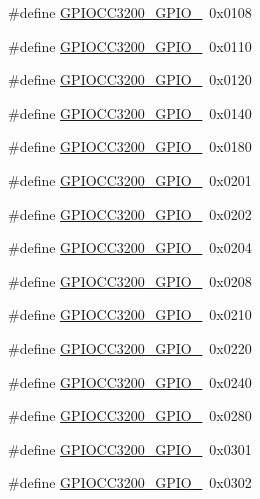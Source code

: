 \begin{DoxyCompactItemize}
\item 
\#define \hyperlink{_g_p_i_o_c_c3200_8h_ad5356861b3ed5561ab9f8adadf76d1aa}{G\+P\+I\+O\+C\+C3200\+\_\+\+G\+P\+I\+O\+\_}~0x0108
\item 
\#define \hyperlink{_g_p_i_o_c_c3200_8h_a2a32d258abb9895cd89e736015103777}{G\+P\+I\+O\+C\+C3200\+\_\+\+G\+P\+I\+O\+\_}~0x0110
\item 
\#define \hyperlink{_g_p_i_o_c_c3200_8h_abd0666f015d58692d940e5d86148bcc6}{G\+P\+I\+O\+C\+C3200\+\_\+\+G\+P\+I\+O\+\_}~0x0120
\item 
\#define \hyperlink{_g_p_i_o_c_c3200_8h_a87e8f985c84c4e3a0431a74578bef818}{G\+P\+I\+O\+C\+C3200\+\_\+\+G\+P\+I\+O\+\_}~0x0140
\item 
\#define \hyperlink{_g_p_i_o_c_c3200_8h_a52c48ab831aab6dbc7d11941f7380ca1}{G\+P\+I\+O\+C\+C3200\+\_\+\+G\+P\+I\+O\+\_}~0x0180
\item 
\#define \hyperlink{_g_p_i_o_c_c3200_8h_abd2aae0eee43c24c318a5a51d612a0e2}{G\+P\+I\+O\+C\+C3200\+\_\+\+G\+P\+I\+O\+\_}~0x0201
\item 
\#define \hyperlink{_g_p_i_o_c_c3200_8h_a972a1431203f21b7ac5e2a4618a2b64b}{G\+P\+I\+O\+C\+C3200\+\_\+\+G\+P\+I\+O\+\_}~0x0202
\item 
\#define \hyperlink{_g_p_i_o_c_c3200_8h_ac60e15f560f438b57c586437fab63cfc}{G\+P\+I\+O\+C\+C3200\+\_\+\+G\+P\+I\+O\+\_}~0x0204
\item 
\#define \hyperlink{_g_p_i_o_c_c3200_8h_a49f8a1662affd2c2e2ddc6f63ecf96fd}{G\+P\+I\+O\+C\+C3200\+\_\+\+G\+P\+I\+O\+\_}~0x0208
\item 
\#define \hyperlink{_g_p_i_o_c_c3200_8h_ad33a7fba3fdb4fda44066b5a592abd32}{G\+P\+I\+O\+C\+C3200\+\_\+\+G\+P\+I\+O\+\_}~0x0210
\item 
\#define \hyperlink{_g_p_i_o_c_c3200_8h_a2e6f9c9e8087d24b2219efe6f9651360}{G\+P\+I\+O\+C\+C3200\+\_\+\+G\+P\+I\+O\+\_}~0x0220
\item 
\#define \hyperlink{_g_p_i_o_c_c3200_8h_a55a6e4b72eb6ed411e21b57c0ec2104b}{G\+P\+I\+O\+C\+C3200\+\_\+\+G\+P\+I\+O\+\_}~0x0240
\item 
\#define \hyperlink{_g_p_i_o_c_c3200_8h_afcb79a753359e428071f5c906b83c2ea}{G\+P\+I\+O\+C\+C3200\+\_\+\+G\+P\+I\+O\+\_}~0x0280
\item 
\#define \hyperlink{_g_p_i_o_c_c3200_8h_acde50e1c128aa313cad5890cdbbee750}{G\+P\+I\+O\+C\+C3200\+\_\+\+G\+P\+I\+O\+\_}~0x0301
\item 
\#define \hyperlink{_g_p_i_o_c_c3200_8h_ae8b7abb0da4734943181643af80ffda6}{G\+P\+I\+O\+C\+C3200\+\_\+\+G\+P\+I\+O\+\_}~0x0302

\end{DoxyCompactItemize}

